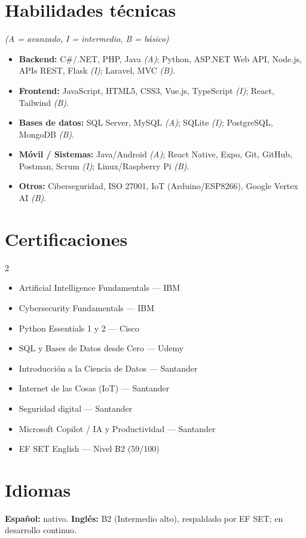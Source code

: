 \documentclass[10pt,a4paper]{article}
\begin{document}
\section{Habilidades técnicas} \textit{\small (A = avanzado, I = intermedio, B = básico)}
\begin{itemize}
  \item \textbf{Backend:} C\#/.NET, PHP, Java \textit{(A)}; Python, ASP.NET Web API, Node.js, APIs REST, Flask \textit{(I)}; Laravel, MVC \textit{(B)}.
  \item \textbf{Frontend:} JavaScript, HTML5, CSS3, Vue.js, TypeScript \textit{(I)}; React, Tailwind \textit{(B)}.
  \item \textbf{Bases de datos:} SQL Server, MySQL \textit{(A)}; SQLite \textit{(I)}; PostgreSQL, MongoDB \textit{(B)}.
  \item \textbf{Móvil / Sistemas:} Java/Android \textit{(A)}; React Native, Expo, Git, GitHub, Postman, Scrum \textit{(I)}; Linux/Raspberry Pi \textit{(B)}.
  \item \textbf{Otros:} Ciberseguridad, ISO 27001, IoT (Arduino/ESP8266), Google Vertex AI \textit{(B)}.
\end{itemize}

\section{Certificaciones}
{\small
\begin{multicols}{2}
\begin{itemize}
  \item Artificial Intelligence Fundamentals --- IBM
  \item Cybersecurity Fundamentals --- IBM
  \item Python Essentials 1 y 2 --- Cisco
  \item SQL y Bases de Datos desde Cero --- Udemy
  \item Introducción a la Ciencia de Datos --- Santander
  \item Internet de las Cosas (IoT) --- Santander
  \item Seguridad digital --- Santander
  \item Microsoft Copilot / IA y Productividad --- Santander
  \item EF SET English --- Nivel B2 (59/100)
\end{itemize}
\end{multicols}}

\section{Idiomas}
\textbf{Español:} nativo. \qquad \textbf{Inglés:} B2 (Intermedio alto), respaldado por EF SET; en desarrollo continuo.
\end{document}

